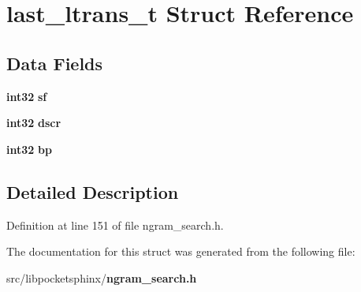 \section{last\-\_\-ltrans\-\_\-t \-Struct \-Reference}
\label{structlast__ltrans__t}
\subsection*{\-Data \-Fields}
\begin{DoxyCompactItemize}
\item 
{\bf int32} {\bfseries sf}\label{structlast__ltrans__t_acaf16ee92b14121c8e357ff4c1c517d7}

\item 
{\bf int32} {\bfseries dscr}\label{structlast__ltrans__t_acef04cbac672e225406402f56002c153}

\item 
{\bf int32} {\bfseries bp}\label{structlast__ltrans__t_ae42bf37affec23a3f3ea46131aa82c99}

\end{DoxyCompactItemize}


\subsection{\-Detailed \-Description}


\-Definition at line 151 of file ngram\-\_\-search.\-h.



\-The documentation for this struct was generated from the following file\-:\begin{DoxyCompactItemize}
\item 
src/libpocketsphinx/{\bf ngram\-\_\-search.\-h}\end{DoxyCompactItemize}
